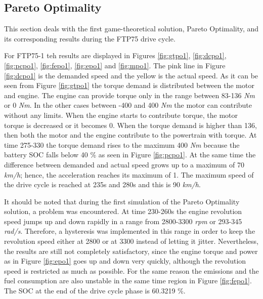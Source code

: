 \subsection{Pareto Optimality}
This section deals with the first game-theoretical solution, Pareto Optimality, and its corresponding results during the FTP75 drive cycle. 

For FTP75-1 teh results are displayed in Figures \ref{fig:gtpo1}, \ref{fig:dcpo1}, \ref{fig:pcpo1}, \ref{fig:fepo1}, \ref{fig:epo1} and \ref{fig:mpo1}. The pink line in Figure \ref{fig:dcpo1} is the demanded speed and the yellow is the actual speed. As it can be seen from Figure \ref{fig:gtpo1} the torque demand is distributed between the motor and engine. The engine can provide torque only in the range between 83-136 \textit{Nm} or 0 \textit{Nm}. In the other cases between -400 and 400 \textit{Nm} the motor can contribute without any limits. When the engine starts to contribute torque, the motor torque is decreased or it becomes 0. When the torque demand is higher than 136, then both the motor and the engine contribute to the powertrain with torque. At time 275-330 the torque demand rises to the maximum 400 \textit{Nm} because the battery SOC falls below 40 \% as seen in Figure \ref{fig:pcpo1}. At the same time the difference between demanded and actual speed grows up to a maximum of 70 \textit{km/h}; hence, the acceleration reaches its maximum of 1. The maximum speed of the drive cycle is reached at 235s and 280s and this is 90 \textit{km/h}. 

It should be noted that during the first simulation of the Pareto Optimality solution, a problem was encountered. At time 230-260s the engine revolution speed jumps up and down rapidly in a range from 2800-3300 \textit{rpm} or 293-345 \textit{rad/s}. Therefore, a hysteresis was implemented in this range in order to keep the revolution speed either at 2800 or at 3300 instead of letting it jitter. Nevertheless, the results are still not completely satisfactory, since the engine torque and power as in Figure \ref{fig:epo1} goes up and down very quickly, although the revolution speed is restricted as much as possible. For the same reason the emissions and the fuel consumption are also unstable in the same time region in Figure \ref{fig:fepo1}. The SOC at the end of the drive cycle phase is 60.3219 \%.

